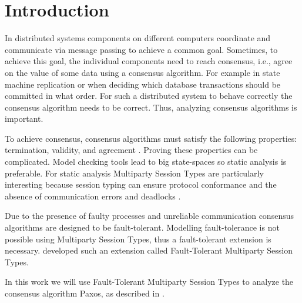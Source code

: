 \chapter{Introduction}
In distributed systems components on different computers coordinate and communicate via message passing to achieve a common goal.
Sometimes, to achieve this goal, the individual components need to reach consensus, i.e., agree on the value of some data using a consensus algorithm.
For example in state machine replication or when deciding which database transactions should be committed in what order.
For such a distributed system to behave correctly the consensus algorithm needs to be correct.
Thus, analyzing consensus algorithms is important.

To achieve consensus, consensus algorithms must satisfy the following properties: termination, validity, and agreement \cite{CoulourisEtal01}.
Proving these properties can be complicated.
Model checking tools lead to big state-spaces so static analysis is preferable.
For static analysis Multiparty Session Types are particularly interesting because session typing can ensure protocol conformance and the absence of communication errors and deadlocks \cite{ScalasEtal18}.

Due to the presence of faulty processes and unreliable communication consensus algorithms are designed to be fault-tolerant.
Modelling fault-tolerance is not possible using Multiparty Session Types, thus a fault-tolerant extension is necessary.
\citeauthor{PetersEtal21} developed such an extension called Fault-Tolerant Multiparty Session Types.

In this work we will use Fault-Tolerant Multiparty Session Types to analyze the consensus algorithm Paxos, as described in \cite{Lamport01}.



